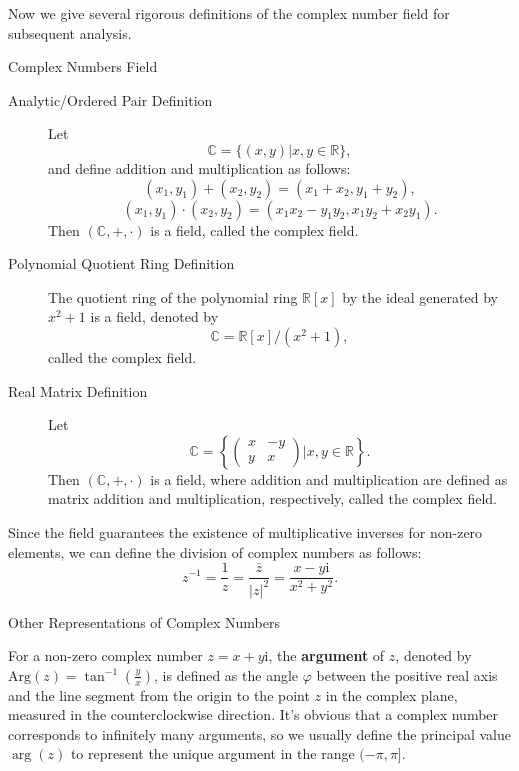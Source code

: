 Now we give several rigorous definitions of the complex number field for subsequent analysis.
\begin{definition}{Complex Numbers Field}
    \begin{description}
        \item[Analytic/Ordered Pair Definition] Let
            \[
            \mathbb{C} = \{(x, y) | x, y \in \mathbb{R}\},
            \]
            and define addition and multiplication as follows:
            \[
                (x_1, y_1) + (x_2, y_2) = (x_1 + x_2, y_1 + y_2),
            \]
            \[
                (x_1, y_1) \cdot (x_2, y_2) = (x_1 x_2 - y_1 y_2, x_1 y_2 + x_2 y_1).
            \]
            Then \((\mathbb{C}, +, \cdot)\) is a field, called the complex field.
        \item[Polynomial Quotient Ring Definition] The quotient ring of the polynomial ring \(\mathbb{R}[x]\) 
            by the ideal generated by \(x^2 + 1\) is a field, denoted by 
            \[
            \mathbb{C} = \mathbb{R}[x]/(x^2 + 1),
            \]
            called the complex field.
        \item[Real Matrix Definition] Let
            \[
            \mathbb{C} = \left\{\begin{pmatrix} x & -y \\ y & x \end{pmatrix} | x, y \in \mathbb{R}\right\}.
            \]
            Then \((\mathbb{C}, +, \cdot)\) is a field, 
            where addition and multiplication are defined as matrix addition and multiplication, respectively, 
            called the complex field.
    \end{description}
\end{definition}
Since the field guarantees the existence of multiplicative inverses for non-zero elements,
we can define the division of complex numbers as follows:
\[
    z^{-1} = \frac{1}{z} = \frac{\bar{z}}{|z|^2} = \frac{x - y\mathrm{i}}{x^2 + y^2}.
\]

\begin{leftbarTitle}{Other Representations of Complex Numbers}\end{leftbarTitle} %
For a non-zero complex number \(z=x+y\mathrm{i}\), the \textbf{argument} of \(z\),
denoted by \(\mathrm{Arg}(z)=\tan^{-1}\left(\frac{y}{x}\right)\), is defined as 
the angle \(\varphi\) between the positive real axis and the line segment from the origin to the point \(z\) in the complex plane, 
measured in the counterclockwise direction.
It's obvious that a complex number corresponds to infinitely many arguments, 
so we usually define the principal value \(\arg(z)\) to represent the unique argument in the range \((-\pi, \pi]\).

